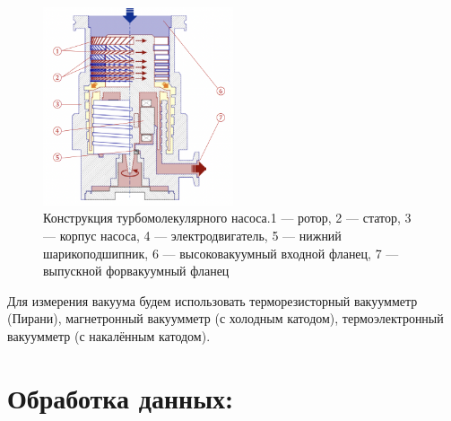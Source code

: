 \documentclass[11pt]{article}
\begin{document}
\begin{figure}[H]
\centering
\captionsetup{justification=centering}
\includegraphics[width=0.5\textwidth]{Рис2.png}
\caption{Конструкция турбомолекулярного насоса.1 — ротор, 2 — статор, 3 — корпус насоса, 4 — электродвигатель, 5 — нижний шарикоподшипник, 6 — высоковакуумный входной фланец, 7 — выпускной форвакуумный фланец}
\end{figure}

Для измерения вакуума будем использовать терморезисторный вакуумметр (Пирани), магнетронный вакуумметр (с холодным катодом),  термоэлектронный вакуумметр (с накалённым катодом).

\section{Обработка данных:}
\end{document}
